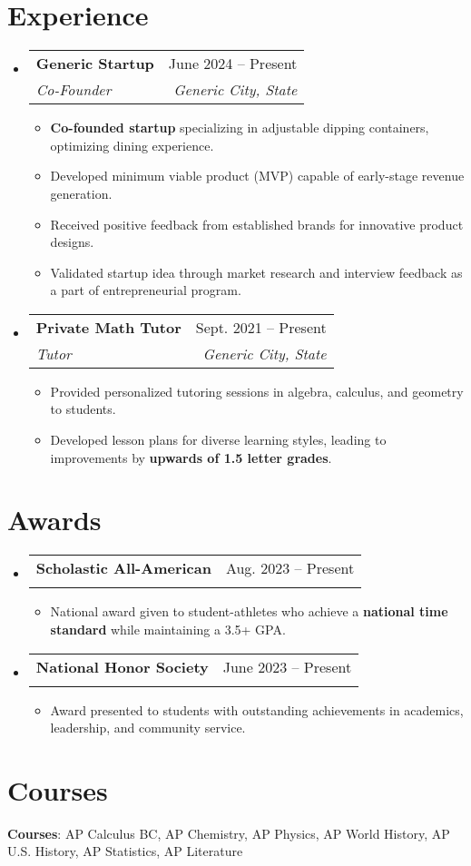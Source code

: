 \documentclass[letterpaper,11pt]{article}
\makeatletter
\newcommand{\resumeItem}[1]{
\item\small{
    {#1 \vspace{-2pt}}
  }
}
\newcommand{\resumeSubheading}[4]{
  \vspace{-2pt}
\item
  \begin{tabular*}{0.97\textwidth}[t]{l@{\extracolsep{\fill}}r}
    \textbf{#1} & #2 \\
    \textit{\small#3} & \textit{\small #4} \\
  \end{tabular*}\vspace{-7pt}
}
\newcommand{\resumeSubHeadingListStart}{
\begin{itemize}[leftmargin=0.15in, label={}]}
\newcommand{\resumeSubHeadingListEnd}{
  \end{itemize}}
\newcommand{\resumeItemListStart}{
\begin{itemize}}
\newcommand{\resumeItemListEnd}{
  \end{itemize}\vspace{-5pt}}
\makeatother
\begin{document}
\section{Experience}
\resumeSubHeadingListStart

\resumeSubheading
{Generic Startup}{June 2024 -- Present}
{Co-Founder}{Generic City, State}
\resumeItemListStart
\resumeItem{\textbf{Co-founded startup} specializing in adjustable dipping containers, optimizing dining experience.}
\resumeItem{Developed minimum viable product (MVP) capable of early-stage revenue generation.}
\resumeItem{Received positive feedback from established brands for innovative product designs.}
\resumeItem{Validated startup idea through market research and interview feedback as a part of entrepreneurial program.}
\resumeItemListEnd

\resumeSubheading
{Private Math Tutor}{Sept. 2021 -- Present}
{Tutor}{Generic City, State}
\resumeItemListStart
\resumeItem{Provided personalized tutoring sessions in algebra, calculus, and geometry to students.}
\resumeItem{Developed lesson plans for diverse learning styles, leading to improvements by \textbf{upwards of 1.5 letter grades}.}
\resumeItemListEnd

\resumeSubHeadingListEnd

\section{Awards}
\resumeSubHeadingListStart
\resumeSubheading
{Scholastic All-American}{Aug. 2023 -- Present}
{}{}
\resumeItemListStart
\vspace{-4mm}
\resumeItem{National award given to student-athletes who achieve a \textbf{national time standard} while maintaining a 3.5+ GPA.}
\resumeItemListEnd

\resumeSubheading
{National Honor Society}{June 2023 -- Present}
{}{}
\resumeItemListStart
\vspace{-4mm}
\resumeItem{Award presented to students with outstanding achievements in academics, leadership, and community service.}
\resumeItemListEnd
\resumeSubHeadingListEnd

\section{Courses}
\begin{itemize}[leftmargin=0.15in, label={}]
    \small{
    \item{
        \vspace{1mm}
        \textbf{Courses}{: AP Calculus BC, AP Chemistry, AP Physics, AP World History, AP U.S. History, AP Statistics, AP Literature} \\

    }}
\end{itemize}
\end{document}
